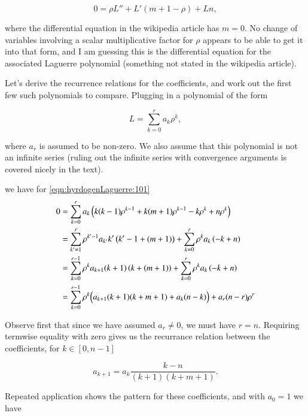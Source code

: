 \begin{equation}\label{eqn:hyrdogenLaguerre:101}
0 =
\rho L''
+L' \left( m + 1 -\rho \right)
+L n,
\end{equation}

where the differential equation in the wikipedia article has $m=0$.  No change of variables involving a scalar multiplicative factor for $\rho$ appears to be able to get it into that form, and I am guessing this is the differential equation for the associated Laguerre polynomial (something not stated in the wikipedia article).

Let's derive the recurrence relations for the coefficients, and work out the first few such polynomials to compare.  Plugging in a polynomial of the form

\begin{equation}\label{eqn:hyrdogenLaguerre:110}
L = \sum_{k=0}^r a_k \rho^{k},
\end{equation}

where $a_r$ is assumed to be non-zero.  We also assume that this polynomial is not an infinite series (ruling out the infinite series with convergence arguments is covered nicely in the text).

we have for \ref{eqn:hyrdogenLaguerre:101}
\begin{align*}
0 &= \sum_{k=0}^r a_k
\left(
k (k-1) \rho^{k-1}
+ k (m+1) \rho^{k-1}
- k \rho^{k}
+ n \rho^{k}
\right) \\
&=
\sum_{{k'}=1}^r
\rho^{{k'}-1}
a_{k'}
{k'} 
\left(
{k'}-1 
+
(m +1)
\right)
+\sum_{k=0}^r
\rho^{k}
a_k
\left(
-
 k 
+
 n 
\right) \\
&=
\sum_{{k}=0}^{r-1}
\rho^{k}
a_{k+1}
(k+1) 
\left(
k 
+
(m+1)
\right)
+\sum_{k=0}^r
\rho^{k}
a_k
\left(
-
 k 
+
 n 
\right) \\
&=
\sum_{{k}=0}^{r-1}
\rho^{k}
\Bigl(
a_{k+1} (k+1) (k + m + 1)
+a_k (n -k)
\Bigr)
+a_r (n-r) \rho^{r}
\end{align*}

Observe first that since we have assumed $a_r \ne 0$, we must have $r=n$.  Requiring termwise equality with zero gives us the recurrance relation between the coefficients, for $k \in [0,n-1]$

\begin{equation}\label{eqn:hyrdogenLaguerre:120}
a_{k+1} = a_k \frac{k - n}{ (k+1) (k + m + 1) }.
\end{equation}

Repeated application shows the pattern for these coefficients, and with $a_0=1$ we have

